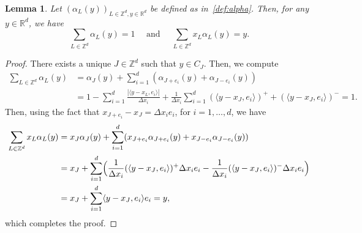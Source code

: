 \documentclass[11pt]{article}
\newtheorem{lemm}[theo]{Lemma}
\theoremstyle{definition}
\numberwithin{equation}{section}
\newcommand*\RR{\mathbb{R}}
\newcommand*\ZZ{\mathbb{Z}}
\begin{document}
\begin{lemm}\label{propalpha}
Let $(\alpha_{L}(y))_{L \in \ZZ^d,y \in \RR^d}$ be defined as in~\eqref{def:alpha}. Then, for any $y \in \RR^d$, we have
\[
\sum_{L\in \ZZ^d} \alpha_{L}(y) = 1 \quad \text{ and } \quad \sum_{L\in \ZZ^d} x_L \alpha_{L}(y) = y.
\]
\end{lemm}

\begin{proof}
There exists a unique $J\in \ZZ^d$ such that $y\in C_J$. Then, we compute
\begin{align*}
\sum_{L\in \ZZ^d} \alpha_{L}(y) & = \alpha_{J}(y) + \sum_{i=1}^d (\alpha_{J+e_i}(y)+\alpha_{J-e_i}(y))
\\
& = 1 - \sum_{i=1}^d \frac{|\langle y-{x_L},e_i\rangle|}{\Delta x_i} + \frac{1}{\Delta x_i} \sum_{i=1}^d (\langle y-x_{J},e_i\rangle )^+ + (\langle y-x_{J},e_i\rangle )^- = 1.
\end{align*}
Then, using the fact that $x_{J+e_i}-x_J = \Delta x_i e_i$, for $i=1,\ldots,d$, we have
\begin{align*}
\sum_{L\in \ZZ^d} x_L \alpha_{L}(y) & = x_J \alpha_J(y) + \sum_{i=1}^d (x_{J+e_i} \alpha_{J+e_i}(y)+ x_{J-e_i} \alpha_{J-e_i}(y))
\\
& = x_J + \sum_{i=1}^d \Bigl(\frac{1}{\Delta x_i} (\langle y-x_J, e_i\rangle )^+ \Delta x_i e_i - \frac{1}{\Delta x_i} (\langle y-x_J, e_i \rangle)^- \Delta x_i e_i \Bigr) \\
& = x_J + \sum_{i=1}^d \langle y-x_J, e_i\rangle e_i = y,
\end{align*}
which completes the proof.
\end{proof}
\end{document}
